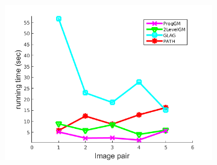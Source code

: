 \documentclass[hyperref={pdfpagelabels=false}]{beamer}
\begin{document}
\begin{frame}[allowframebreaks]
\begin{figure}[h]
\begin{subfigure}[b]{0.32\textwidth}
			\includegraphics[scale=0.15]{"fig/evaluation/ImageTrafo/anchor_descr/using_cpd_afftrafo/performance/time1"}
		\end{subfigure} 	
\end{figure}

\framebreak


\end{frame}
\end{document}
